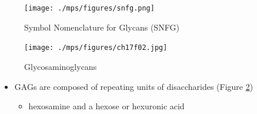 \documentclass{scrartcl}
\begin{document}
\begin{figure}[htbp]
\centering
\texttt{[image: ./mps/figures/snfg.png]}
\caption[Glycan Nomenclature]{\label{fig:orgdc8e07a}
Symbol Nomenclature for Glycans (SNFG)}
\end{figure}


\begin{figure}[htbp]
\centering
\texttt{[image: ./mps/figures/ch17f02.jpg]}
\caption[Glycosaminoglycans]{\label{fig:org56488fc}
Glycosaminoglycans}
\end{figure}

\begin{itemize}
\item GAGs are composed of repeating units of disaccharides (Figure \ref{fig:org56488fc})
\begin{itemize}
\item hexosamine and a hexose or hexuronic acid
\end{itemize}
\end{itemize}
\end{document}
